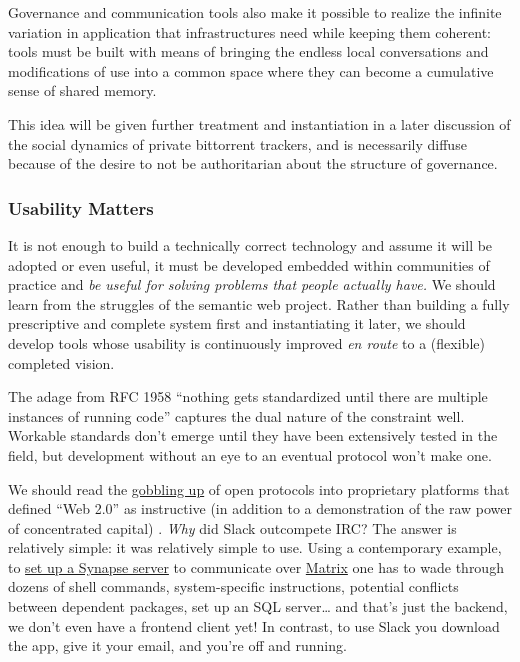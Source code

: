 \documentclass[11pt]{article}
\begin{document}
\begin{multicols}{2}
Governance and communication tools also make it possible to realize the
infinite variation in application that infrastructures need while
keeping them coherent: tools must be built with means of bringing the
endless local conversations and modifications of use into a common space
where they can become a cumulative sense of shared memory.

This idea will be given further treatment and instantiation in a later
discussion of the social dynamics of private bittorrent trackers, and is
necessarily diffuse because of the desire to not be authoritarian about
the structure of governance.

\hypertarget{usability-matters}{%
\subsubsection{Usability Matters}\label{usability-matters}}

It is not enough to build a technically correct technology and assume it
will be adopted or even useful, it must be developed embedded within
communities of practice and \emph{be useful for solving problems that
people actually have.} We should learn from the struggles of the
semantic web project. Rather than building a fully prescriptive and
complete system first and instantiating it later, we should develop
tools whose usability is continuously improved \emph{en route} to a
(flexible) completed vision.

The adage from RFC 1958 ``nothing gets standardized until there are
multiple instances of running code'' \cite{carpenterRFC1958Architectural1996}  captures the dual nature of the
constraint well. Workable standards don't emerge until they have been
extensively tested in the field, but development without an eye to an
eventual protocol won't make one.

We should read the
\href{https://en.wikipedia.org/wiki/Embrace,_extend,_and_extinguish}{gobbling
up} of open protocols into proprietary platforms that defined ``Web
2.0'' as instructive (in addition to a demonstration of the raw power of
concentrated capital) \cite{markoffTomorrowWorldWide1996} .
\emph{Why} did Slack outcompete IRC? The answer is relatively simple: it
was relatively simple to use. Using a contemporary example, to
\href{https://matrix-org.github.io/synapse/latest/setup/installation.html}{set
up a Synapse server} to communicate over
\href{https://matrix.org/docs/spec/}{Matrix} one has to wade through
dozens of shell commands, system-specific instructions, potential
conflicts between dependent packages, set up an SQL server\ldots{} and
that's just the backend, we don't even have a frontend client yet! In
contrast, to use Slack you download the app, give it your email, and
you're off and running.


\end{multicols}
\end{document}
